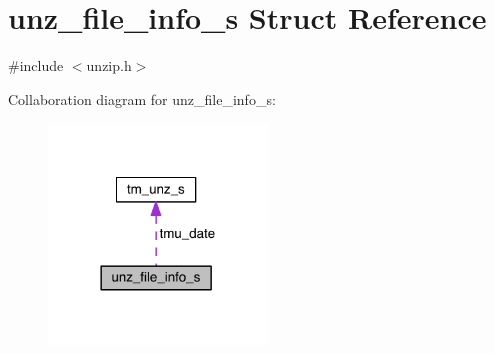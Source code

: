 \hypertarget{structunz__file__info__s}{\section{unz\+\_\+file\+\_\+info\+\_\+s Struct Reference}
\label{structunz__file__info__s}
}


{\ttfamily \#include $<$unzip.\+h$>$}



Collaboration diagram for unz\+\_\+file\+\_\+info\+\_\+s\+:\nopagebreak
\begin{figure}[H]
\begin{center}
\leavevmode
\includegraphics[width=165pt]{d2/dd5/structunz__file__info__s__coll__graph}
\end{center}
\end{figure}
